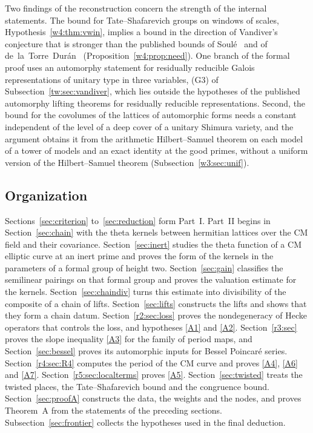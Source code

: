 Two findings of the reconstruction concern the strength of the internal statements. The bound for Tate--Shafarevich groups on windows of scales, Hypothesis~\ref{w4:thm:vwin}, implies a bound in the direction of Vandiver's conjecture that is stronger than the published bounds of Soul\'e~\cite{soule99} and of de~la~Torre~Dur\'an~\cite{delatorre} (Proposition~\ref{w4:prop:need}). One branch of the formal proof uses an automorphy statement for residually reducible Galois representations of unitary type in three variables, (G3) of Subsection~\ref{tw:sec:vandiver}, which lies outside the hypotheses of the published automorphy lifting theorems for residually reducible representations. Second, the bound for the covolumes of the lattices of automorphic forms needs a constant independent of the level of a deep cover of a unitary Shimura variety, and the argument obtains it from the arithmetic Hilbert--Samuel theorem on each model of a tower of models and an exact identity at the good primes, without a uniform version of the Hilbert--Samuel theorem (Subsection~\ref{w3:sec:unif}).

\subsection{Organization}\label{sec:organization}

Sections~\ref{sec:criterion} to~\ref{sec:reduction} form Part~I. Part~II begins in Section~\ref{sec:chain} with the theta kernels between hermitian lattices over the CM field and their covariance. Section~\ref{sec:inert} studies the theta function of a CM elliptic curve at an inert prime and proves the form of the kernels in the parameters of a formal group of height two. Section~\ref{sec:gain} classifies the semilinear pairings on that formal group and proves the valuation estimate for the kernels. Section~\ref{sec:chaindiv} turns this estimate into divisibility of the composite of a chain of lifts. Section~\ref{sec:lifts} constructs the lifts and shows that they form a chain datum. Section~\ref{r2:sec:loss} proves the nondegeneracy of Hecke operators that controls the loss, and hypotheses \eqref{A1} and \eqref{A2}. Section~\ref{r3:sec} proves the slope inequality \eqref{A3} for the family of period maps, and Section~\ref{sec:bessel} proves its automorphic inputs for Bessel Poincar\'e series. Section~\ref{r4:sec:R4} computes the period of the CM curve and proves \eqref{A4}, \eqref{A6} and \eqref{A7}. Section~\ref{r5:sec:localterms} proves \eqref{A5}. Section~\ref{sec:twisted} treats the twisted places, the Tate--Shafarevich bound and the congruence bound. Section~\ref{sec:proofA} constructs the data, the weights and the nodes, and proves Theorem~A from the statements of the preceding sections. Subsection~\ref{sec:frontier} collects the hypotheses used in the final deduction.
